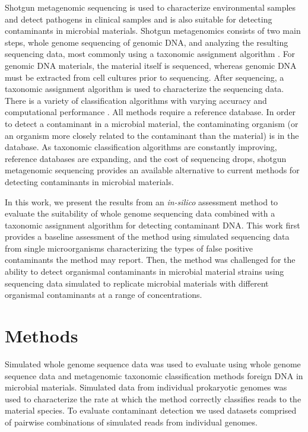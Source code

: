 \documentclass[fleqn,10pt,lineno]{wlpeerj}\usepackage[]{graphicx}\usepackage[]{color}
\begin{document}
Shotgun metagenomic sequencing is used to characterize environmental samples and detect pathogens in clinical samples and is also suitable for detecting contaminants in microbial materials. 
Shotgun metagenomics consists of two main steps, whole genome sequencing of genomic DNA, and analyzing the resulting sequencing data, most commonly using a taxonomic assignment algorithm \citep{Thomas2012}. 
For genomic DNA materials, the material itself is sequenced, whereas genomic DNA must be extracted from cell cultures prior to sequencing. 
After sequencing, a taxonomic assignment algorithm is used to characterize the sequencing data. 
There is a variety of classification algorithms with varying accuracy and computational performance \citep{Bazinet2012,menzel2016fast}.
All methods require a reference database.
In order to detect a contaminant in a microbial material, the contaminating organism (or an organism more closely related to the contaminant than the material) is in the database. 
As taxonomic classification algorithms are constantly improving, reference databases are expanding, and the cost of sequencing drops, shotgun metagenomic sequencing provides an available alternative to current methods for detecting contaminants in microbial materials.

In this work, we present the results from an \textit{in-silico} assessment method to evaluate the suitability of whole genome sequencing data combined with a taxonomic assignment algorithm for detecting contaminant DNA.
This work first provides a baseline assessment of the method using simulated sequencing data from single microorganisms characterizing the types of false positive contaminants the method may report.
Then, the method was challenged for the ability to detect organismal contaminants in microbial material strains using sequencing data simulated to replicate microbial materials with different organismal contaminants at a range of concentrations.

\section*{Methods}
Simulated whole genome sequence data was used to evaluate using whole genome sequence data and metagenomic taxonomic classification methods foreign DNA in microbial materials.
Simulated data from individual prokaryotic genomes was used to characterize the rate at which the method correctly classifies reads to the material species.
To evaluate contaminant detection we used datasets comprised of pairwise combinations of simulated reads from individual genomes.  
\end{document}
